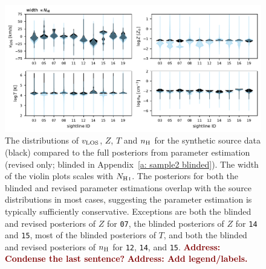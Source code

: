 \documentclass[fleqn,usenatbib]{mnras}
\newcommand{\todo}[1]{\textcolor{Maroon}{\textbf{Address: #1}}}
\begin{document}
\begin{figure}
    \centering
    \includegraphics[width=\textwidth]{figures/sample2/violin_revised.pdf}
    \caption{
    The distributions of $v_{\rm LOS}$, $Z$, $T$ and $n_{\rm H}$ for the synthetic source data (black) compared to the full posteriors from parameter estimation (revised only; blinded in Appendix~\ref{a: sample2 blinded}).
    The width of the violin plots scales with $N_{\ion{H}{I}}$.
    The posteriors for both the blinded and revised parameter estimations overlap with the source distributions in most cases, suggesting the parameter estimation is typically sufficiently conservative.
    Exceptions are
    both the blinded and revised posteriors of $Z$ for \texttt{07},
    the blinded posteriors of $Z$ for \texttt{14} and \texttt{15},
    most of the blinded posteriors of $T$,
    and both the blinded and revised posteriors of $n_{\rm H}$ for \texttt{12}, \texttt{14}, and \texttt{15}.
    \todo{Condense the last sentence?}
    \todo{Add legend/labels.}
    }
    \label{f: sample2 violin}
\end{figure}
\end{document}
